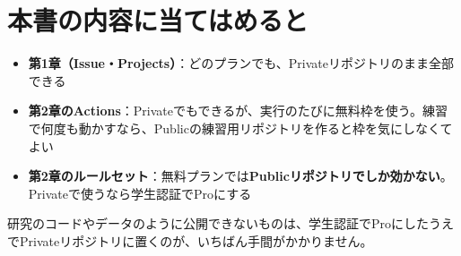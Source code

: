 \documentclass[book, paper=a4, fontsize=10.5pt, titlepage]{jlreq}
\begin{document}
\section{本書の内容に当てはめると}

\begin{itemize}[leftmargin=1.4em]
  \item \textbf{第1章（Issue・Projects）}：どのプランでも、Privateリポジトリのまま全部できる
  \item \textbf{第2章のActions}：Privateでもできるが、実行のたびに無料枠を使う。練習で何度も動かすなら、Publicの練習用リポジトリを作ると枠を気にしなくてよい
  \item \textbf{第2章のルールセット}：無料プランでは\textbf{Publicリポジトリでしか効かない}。Privateで使うなら学生認証でProにする
\end{itemize}

研究のコードやデータのように公開できないものは、学生認証でProにしたうえでPrivateリポジトリに置くのが、いちばん手間がかかりません。
\end{document}
